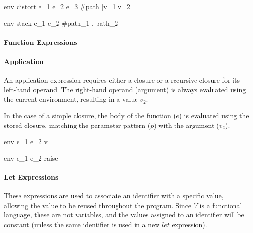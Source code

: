 \documentclass{article}
\begin{document}
    {\mbox{env} \vdash distort \; e_1 \; e_2 \; e_3 \Downarrow \#path [v_1 \; v_2]}

    {\mbox{env} \vdash stack \; e_1 \; e_2 \Downarrow \#path_1 \; . \; path_2}



\paragraph{Function Expressions}


\paragraph{Application}
An application expression requires either a closure or a recursive closure for its left-hand operand.
The right-hand operand (argument) is always evaluated using the current environment, resulting in a value $v_2$.
\smallskip

In the case of a simple closure, the body of the function ($e$) is evaluated using the stored closure, matching the parameter pattern ($p$) with the argument ($v_2$).

    {\mbox{env} \vdash e_1 \; e_2 \Downarrow v}

    {\mbox{env} \vdash e_1 \; e_2 \Downarrow raise}

\paragraph{Let Expressions}
These expressions are used to associate an identifier with a specific value, allowing the value to be reused throughout the program.
Since $V$ is a functional language, these are not variables, and the values assigned to an identifier will be constant (unless the same identifier is used in a new $let$ expression).
\end{document}
